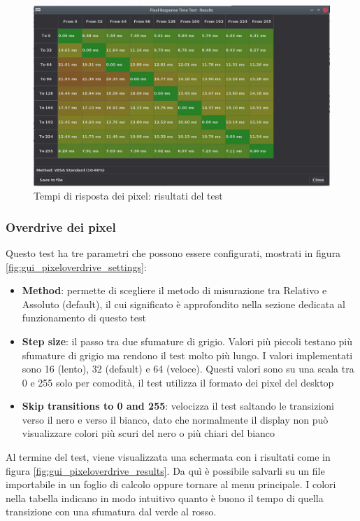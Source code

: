 \begin{figure}[H]
	\centering
	\includegraphics[width=\textwidth]{Applicazione_files/gui_pixelresponse_results.png}
	\caption{Tempi di risposta dei pixel: risultati del test}
	\label{fig:gui_pixelresponse_results}
\end{figure}

\subsubsection{Overdrive dei pixel}
Questo test ha tre parametri che possono essere configurati, mostrati in figura \ref{fig:gui_pixeloverdrive_settings}:\begin{itemize}
	\item \textbf{Method}: permette di scegliere il metodo di misurazione tra Relativo e Assoluto (default), il cui significato è approfondito nella sezione dedicata al funzionamento di questo test
	\item \textbf{Step size}: il passo tra due sfumature di grigio. Valori più piccoli testano più sfumature di grigio ma rendono il test molto più lungo. I valori implementati sono 16 (lento), 32 (default) e 64 (veloce). Questi valori sono su una scala tra 0 e 255 solo per comodità, il test utilizza il formato dei pixel del desktop
	\item \textbf{Skip transitions to 0 and 255}: velocizza il test saltando le transizioni verso il nero e verso il bianco, dato che normalmente il display non può visualizzare colori più scuri del nero o più chiari del bianco
\end{itemize}

Al termine del test, viene visualizzata una schermata con i risultati come in figura \ref{fig:gui_pixeloverdrive_results}. Da quì è possibile salvarli su un file importabile in un foglio di calcolo oppure tornare al menu principale. I colori nella tabella indicano in modo intuitivo quanto è buono il tempo di quella transizione con una sfumatura dal verde al rosso.

